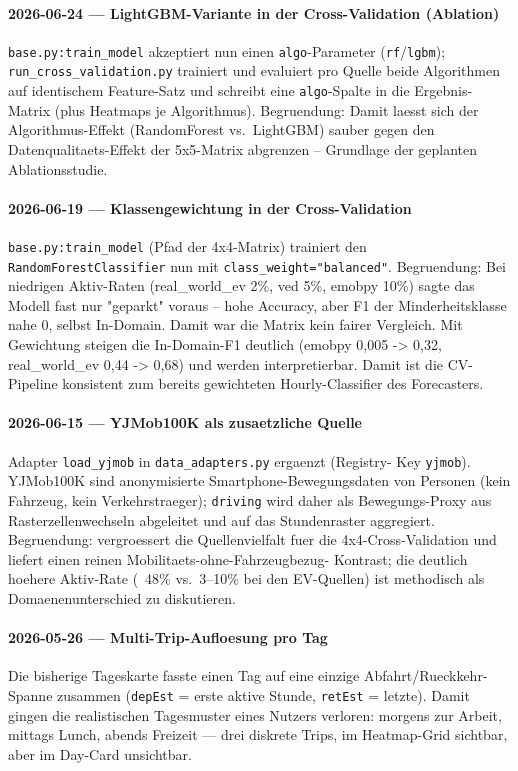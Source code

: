 \paragraph{2026-06-24 --- LightGBM-Variante in der Cross-Validation (Ablation)}
\texttt{base.py:train\_model} akzeptiert nun einen \texttt{algo}-Parameter
(\texttt{rf}/\texttt{lgbm}); \texttt{run\_cross\_validation.py} trainiert und
evaluiert pro Quelle beide Algorithmen auf identischem Feature-Satz und schreibt
eine \texttt{algo}-Spalte in die Ergebnis-Matrix (plus Heatmaps je Algorithmus).
Begruendung: Damit laesst sich der Algorithmus-Effekt (RandomForest vs.\
LightGBM) sauber gegen den Datenqualitaets-Effekt der 5x5-Matrix abgrenzen --
Grundlage der geplanten Ablationsstudie.

\paragraph{2026-06-19 --- Klassengewichtung in der Cross-Validation}
\texttt{base.py:train\_model} (Pfad der 4x4-Matrix) trainiert den
\texttt{RandomForestClassifier} nun mit \texttt{class\_weight="balanced"}.
Begruendung: Bei niedrigen Aktiv-Raten (real\_world\_ev 2\%, ved 5\%, emobpy 10\%)
sagte das Modell fast nur "geparkt" voraus -- hohe Accuracy, aber F1 der
Minderheitsklasse nahe 0, selbst In-Domain. Damit war die Matrix kein fairer
Vergleich. Mit Gewichtung steigen die In-Domain-F1 deutlich (emobpy 0{,}005 ->
0{,}32, real\_world\_ev 0{,}44 -> 0{,}68) und werden interpretierbar. Damit ist
die CV-Pipeline konsistent zum bereits gewichteten Hourly-Classifier des
Forecasters.

\paragraph{2026-06-15 --- YJMob100K als zusaetzliche Quelle}
Adapter \texttt{load\_yjmob} in \texttt{data\_adapters.py} ergaenzt (Registry-
Key \texttt{yjmob}). YJMob100K sind anonymisierte Smartphone-Bewegungsdaten von
Personen (kein Fahrzeug, kein Verkehrstraeger); \texttt{driving} wird daher als
Bewegungs-Proxy aus Rasterzellenwechseln abgeleitet und auf das Stundenraster
aggregiert. Begruendung: vergroessert die Quellenvielfalt fuer die
4x4-Cross-Validation und liefert einen reinen Mobilitaets-ohne-Fahrzeugbezug-
Kontrast; die deutlich hoehere Aktiv-Rate (~48\% vs.\ 3--10\% bei den
EV-Quellen) ist methodisch als Domaenenunterschied zu diskutieren.

\paragraph{2026-05-26 --- Multi-Trip-Aufloesung pro Tag}
Die bisherige Tageskarte fasste einen Tag auf eine einzige
Abfahrt/Rueckkehr-Spanne zusammen (\texttt{depEst} = erste aktive Stunde,
\texttt{retEst} = letzte). Damit gingen die realistischen Tagesmuster eines
Nutzers verloren: morgens zur Arbeit, mittags Lunch, abends Freizeit ---
drei diskrete Trips, im Heatmap-Grid sichtbar, aber im Day-Card unsichtbar.

